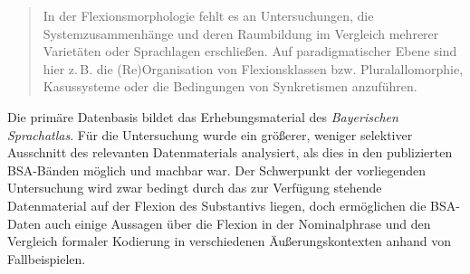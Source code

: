 \begin{quote}
In der Flexionsmorphologie fehlt es an Untersuchungen, die Systemzusammenhänge und deren Raumbildung im Vergleich mehrerer Varietäten oder Sprachlagen erschließen. Auf paradigmatischer Ebene sind hier z.\,B. die (Re)Organisation von Flexionsklassen bzw. Pluralallomorphie, Kasussysteme oder die Bedingungen von Synkretismen anzuführen.
\end{quote}

\begin{sloppypar}
Die primäre Datenbasis bildet das Erhebungsmaterial des \textit{Bayerischen Sprachatlas}. Für die Untersuchung wurde ein größerer, weniger selektiver Ausschnitt des relevanten Datenmaterials analysiert, als dies in den publizierten BSA-Bän\-den möglich und machbar war. Der Schwerpunkt der vorliegenden Untersuchung wird zwar bedingt durch das zur Verfügung stehende Datenmaterial auf der Flexion des Substantivs liegen, doch ermöglichen die BSA-Daten auch einige Aussagen über die Flexion in der Nominalphrase und den Vergleich formaler Kodierung in verschiedenen Äußerungskontexten anhand von Fallbeispielen.
\end{sloppypar}

